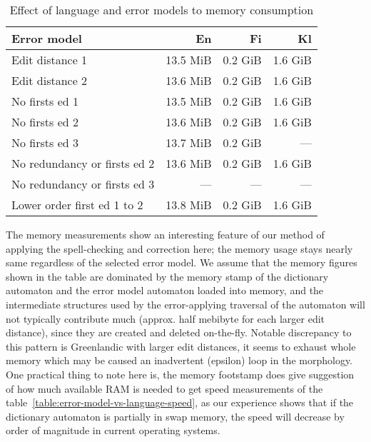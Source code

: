 \documentclass[11pt]{article}
\begin{document}
\begin{table}[h]
\begin{center}
\begin{scriptsize}
\begin{tabular}{|l|rrr|}
\hline
\bf Error model & \bf En & \bf Fi & \bf Kl \\ 
\hline
Edit distance 1 &
13.5 MiB&0.2 GiB&1.6 GiB
\\
Edit distance 2 &
13.6 MiB&0.2 GiB&1.6 GiB
\\
No firsts ed 1 & 
13.5 MiB&0.2 GiB&1.6 GiB
\\
No firsts ed 2 &
13.6 MiB&0.2 GiB&1.6 GiB
\\
No firsts ed 3 &
13.7 MiB&0.2 GiB&---
\\
No redundancy or firsts ed 2 &
13.6 MiB&0.2 GiB&1.6 GiB
\\
No redundancy or firsts ed 3 &
---&---&---
\\
Lower order first ed 1 to 2 &
13.8 MiB&0.2 GiB&1.6 GiB
\\
\hline
\end{tabular}
\end{scriptsize}
\end{center}
\caption{\label{table:error-model-vs-language-memory} Effect of language and 
error models to memory consumption}
\end{table}

The memory measurements show an interesting feature of our method of applying
the spell-checking and correction here; the memory usage stays nearly same
regardless of the selected error model. We assume that the memory figures shown
in the table are dominated by the memory stamp of the dictionary automaton and
the error model automaton loaded into memory, and the intermediate structures
used by the error-applying traversal of the automaton will not typically
contribute much (approx. half mebibyte for each larger edit distance), since
they are created and deleted on-the-fly. Notable discrepancy to this pattern is
Greenlandic with larger edit distances, it seems to exhaust whole memory which
may be caused an inadvertent (epsilon) loop in the morphology. One practical
thing to note here is, the memory footstamp does give suggestion of how much
available RAM is needed to get speed measurements of the
table~\ref{table:error-model-vs-language-speed}, as our experience shows that
if the dictionary automaton is partially in swap memory, the speed will
decrease by order of magnitude in current operating systems.
\end{document}
